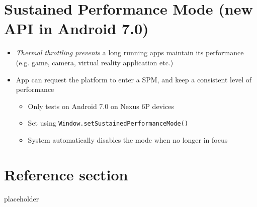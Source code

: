 \documentclass{article}
\begin{document}
\section{Sustained Performance Mode (new API in Android 7.0)}
\begin{itemize}
  \item \textit{Thermal throttling prevents} a long running apps maintain its performance (e.g. game, camera, virtual reality application etc.) 
  \item App can request the platform to enter a SPM, and keep a consistent level of performance
  \begin{itemize}
    \item Only tests on Android 7.0 on Nexus 6P devices 
    \item Set using \verb|Window.setSustainedPerformanceMode()|
    \item System automatically disables the mode when no longer in focus
  \end{itemize}
\end{itemize}

\pagebreak
\section*{Reference section} \label{sec:reference}
\begin{description}
	\item[placeholder] \hfill \\
\end{description}
\end{document}
